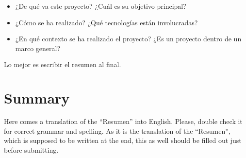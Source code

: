 \documentclass[
paper=a4,
fontsize=12pt,
oneside,
openright,                  %
titlepage,                  %
headsepline,                %
footheight=16pt,            %
parskip=half+,				%
numbers=noenddot,			%
headinclude=true,           %
footinclude=true,           %
cleardoublepage=empty,      %
captions=tableheading,      %
BCOR=5mm, 				    %
DIV=9   			        %
usegeometry=true			%
]{scrbook}
\begin{document}
{\begin{itemize}
  \item ¿De qué va este proyecto? ¿Cuál es su objetivo principal?
  \item ¿Cómo se ha realizado? ¿Qué tecnologías están involucradas?
  \item ¿En qué contexto se ha realizado el proyecto? ¿Es un proyecto dentro de un marco general?
\end{itemize}

Lo mejor es escribir el resumen al final.


\chapter*{Summary}

Here comes a translation of the ``Resumen'' into English. 
Please, double check it for correct grammar and spelling.
As it is the translation of the ``Resumen'', which is supposed to be written at the end, this as well should be filled out just before submitting.



\restoregeometry



\tableofcontents 

\cleardoublepage
\listoffigures %

}
\end{document}
